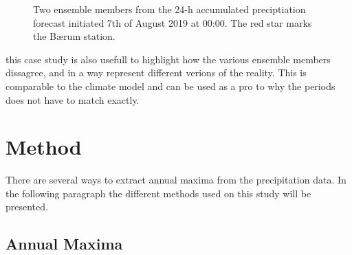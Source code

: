 \begin{figure}[hbt!]%
    \centering
    \qquad
    \caption{Two ensemble members from the 24-h accumulated preciptiation forecast initiated 7th of August 2019 at 00:00. The red star marks the Bærum station.}%
    \label{fig:ensmember}%
\end{figure}

this case study is also usefull to highlight how the various ensemble members dissagree, and in a way represent different verions of the reality. This is comparable to the climate model and can be used as a pro to why the periods does not have to match exactly.  
\section{Method}

There are several ways to extract annual maxima from the precipitation data. In the following paragraph the different methods used on this study will be presented.  
\subsection{Annual Maxima}

